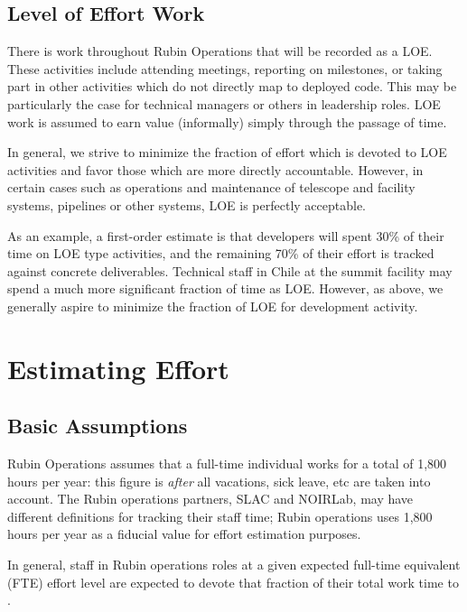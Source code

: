 \subsection{Level of Effort Work}
\label{sec:loe}

There is work throughout Rubin Operations that will be recorded as a \gls{LOE}. 
These activities include attending meetings, reporting on milestones, or taking part in other activities which do not directly map to deployed code.
This may be particularly the case for technical managers or others in leadership roles.
\gls{LOE} work is assumed to earn value (informally) simply through the passage of time.

In general, we strive to minimize the fraction of effort which is devoted to \gls{LOE} activities and favor those which are more directly accountable.
However, in certain cases such as operations and maintenance of telescope and facility systems, pipelines or other systems, \gls{LOE} is perfectly acceptable.

As an example, a first-order estimate is that developers will spent 30\% of their time on \gls{LOE} type activities, and the remaining 70\% of their effort is tracked against concrete deliverables. 
Technical staff in Chile at the summit facility may spend a much more significant fraction of time as  \gls{LOE}.
However, as above, we generally aspire to minimize the fraction of \gls{LOE} for development activity.


\section{Estimating Effort}
\label{sec:effort}

\subsection{Basic Assumptions}
Rubin Operations assumes that a full-time individual works for a total of 1,800 hours per year: this figure is \emph{after} all vacations, sick leave, etc are taken into account.
The Rubin operations partners, SLAC and NOIRLab, may have different definitions for tracking their staff time; Rubin operations uses 1,800 hours per year as a fiducial value for effort estimation purposes.

In general, staff in Rubin operations roles at a given expected full-time equivalent (FTE) effort level are expected to devote that fraction of their total work time to \RO.

